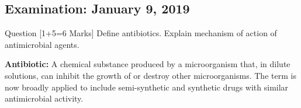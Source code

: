 \documentclass[11pt,a4paper]{article}
\begin{document}
\subsection{Examination: January 9, 2019}

\begin{qbox}{Question [1+5=6 Marks]}
Define antibiotics. Explain mechanism of action of antimicrobial agents.
\end{qbox}

\begin{ansbox}
\textbf{Antibiotic:} A chemical substance produced by a microorganism that, in dilute solutions, can inhibit the growth of or destroy other microorganisms. The term is now broadly applied to include semi-synthetic and synthetic drugs with similar antimicrobial activity.


\end{ansbox}
\end{document}
